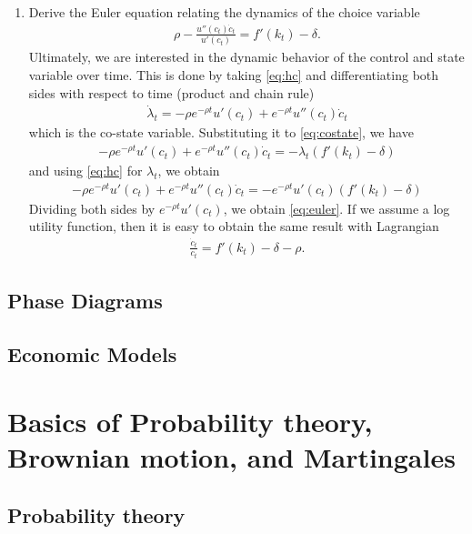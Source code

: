\documentclass[11pt,a4paper]{book}
\theoremstyle{definition}\newtheorem{definition}{Definition}
\theoremstyle{definition}\newtheorem{fact}{Fact}
\theoremstyle{definition}\newtheorem{remark}{Remark}
\theoremstyle{definition}\newtheorem{ex}{Ex.}
\theoremstyle{definition}\newtheorem{project}{Project}
\theoremstyle{definition}\newtheorem{problem}{Problem}
\theoremstyle{definition}\newtheorem{example}{Example}
\numberwithin{theorem}{section}
\numberwithin{corollary}{chapter}
\numberwithin{assumption}{chapter}
\numberwithin{definition}{chapter}
\numberwithin{prop}{chapter}
\numberwithin{notation}{chapter}
\numberwithin{problem}{chapter}
\numberwithin{example}{chapter}
\numberwithin{fact}{chapter}
\numberwithin{ex}{chapter}
\begin{document}
\begin{enumerate}
		\item Derive the Euler equation relating the dynamics of the choice variable
		\begin{align}
			\rho - \frac{u''(c_t) \dot{c}_t}{u'(c_t)} = f'(k_t) - \delta. \label{eq:euler}
		\end{align}
		Ultimately, we are interested in the dynamic behavior of the control and state variable over time. This is done by taking \eqref{eq:hc} and differentiating both sides with respect to time (product and chain rule)
		\begin{align}
			\dot{\lambda}_t = -\rho e^{-\rho t} u'(c_t) + e^{-\rho t} u''(c_t) \dot{c}_t
		\end{align}
		which is the co-state variable. Substituting it to \eqref{eq:costate}, we have
		\begin{align*}
			-\rho e^{-\rho t} u'(c_t) + e^{-\rho t} u''(c_t) \dot{c}_t = -\lambda_t (f'(k_t)-\delta)
		\end{align*}
		and using \eqref{eq:hc} for $\lambda_t$, we obtain
		\begin{align*}
			-\rho e^{-\rho t} u'(c_t) + e^{-\rho t} u''(c_t) \dot{c}_t = - e^{-\rho t} u'(c_t) (f'(k_t)-\delta)
		\end{align*}
		Dividing both sides by $e^{-\rho t} u'(c_t)$, we obtain \eqref{eq:euler}. If we assume a log utility function, then it is easy to obtain the same result with Lagrangian
		\begin{align*}
			\frac{\dot{c}_t}{c_t} = f'(k_t) - \delta - \rho. 
		\end{align*}
	\end{enumerate}
	
	\section{Phase Diagrams}
	
	\section{Economic Models}
		
\chapter{Basics of Probability theory, Brownian motion, and Martingales}

\section{Probability theory}
\end{document}
